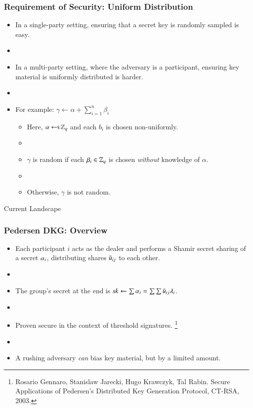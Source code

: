 \documentclass[hyperref={pdfpagelabels=true},table,dvipsnames,14pt,aspectratio=169]{beamer}
\begin{document}
\begin{frame}
  \frametitle{Requirement of Security: Uniform Distribution}

  \begin{itemize}
    \item<1-> In a single-party setting, ensuring that a secret key is randomly sampled is easy.
    \item[]
    \item<2-> In a multi-party setting, where the adversary is a participant,
      ensuring key material is uniformly distributed is harder.
    \item[]
    \item<3-> For example: $\gamma \gets \alpha + \sum_{i=1}^n \beta_i$
  \begin{itemize}
    \item<4-> Here, $\alpha \hskip2.3pt{\gets\!\!\mbox{\scriptsize${\$}$\normalsize}}\, \mathbb{Z}_q$ and each $b_i$ is chosen non-uniformly.
    \item[]
    \item<5-> $\gamma$ is random if each $\beta_i \in \mathbb{Z}_q$ is chosen \emph{without} knowledge of $\alpha$.
    \item[]
    \item<6-> Otherwise, $\gamma$ is not random.
  \end{itemize}
  \end{itemize}
\end{frame}

\begin{frame}
  \huge
  \centering
  Current Landscape
\end{frame}

\begin{frame}
  \frametitle{Pedersen DKG: Overview}

  \begin{itemize}
    \item<1-> Each participant $i$ acts as the dealer and performs a Shamir secret sharing of a secret $\alpha_i$,
      distributing shares $\bar{u}_{ij}$ to each other.
    \item[]
    \item<2-> The group's secret at the end is $\mathit{sk} \gets \sum \alpha_i = \sum \sum \bar{u}_{ij} \lambda_i$.
    \item[]
    \item<3-> Proven secure in the context of threshold signatures.
  \footnote{
  Rosario Gennaro, Stanislaw Jarecki, Hugo Krawczyk, Tal Rabin.
  Secure Applications of Pedersen's Distributed Key Generation Protocol,
  CT-RSA, 2003.}
    \item[]
    \item<4-> A rushing adversary \emph{can} bias key material, but by a limited amount.
  \end{itemize}
\end{frame}
\end{document}

